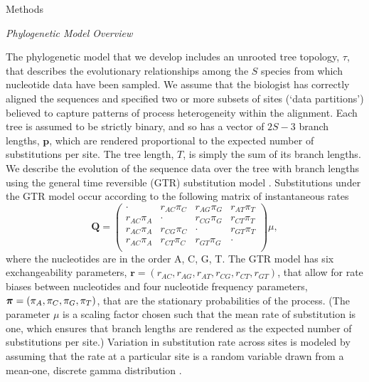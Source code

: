 \documentclass[11pt]{article}
\begin{document}
\bigskip

\begin{center}
{\sc Methods}
\end{center}

\begin{center}
{\it Phylogenetic Model Overview}
\end{center}

The phylogenetic model that we develop includes an unrooted tree topology, $\tau$, that describes the evolutionary relationships among the ${S}$ species from which nucleotide data have been sampled.
We assume that the biologist has correctly aligned the sequences and specified two or more subsets of sites (`data partitions') believed to capture patterns of process heterogeneity within the alignment.   
Each tree is assumed to be strictly binary, and so has a vector of $2S-3$ branch lengths, ${\mathbf p}$, which are rendered proportional to the expected number of substitutions per site.
The tree length, $T$, is simply the sum of its branch lengths. 
We describe the evolution of the sequence data over the tree with branch lengths using the general time reversible (GTR) substitution model \citep{tavare86}.
Substitutions under the GTR model occur according to the following matrix of instantaneous rates
$$
{\mathbf Q} = \left( \begin{array}{cccc}
\cdot       & r_{AC}\pi_C & r_{AG}\pi_G & r_{AT}\pi_T \\
r_{AC}\pi_A & \cdot       & r_{CG}\pi_G & r_{CT}\pi_T \\
r_{AC}\pi_A & r_{CG}\pi_C & \cdot       & r_{GT}\pi_T \\
r_{AC}\pi_A & r_{CT}\pi_C & r_{GT}\pi_G & \cdot       \\
\end{array} \right) \mu,
$$
where the nucleotides are in the order A, C, G, T. The GTR model has six exchangeability parameters, ${\mathbf r} = (r_{AC}, r_{AG}, r_{AT}, r_{CG}, r_{CT}, r_{GT})$, that allow for rate biases between nucleotides and four nucleotide frequency parameters, $\mbox{\boldmath$\pi$\unboldmath} = (\pi_A, \pi_C, \pi_G, \pi_T)$, that are the stationary probabilities of the process. 
(The parameter $\mu$ is a scaling factor chosen such that the mean rate of substitution is one, which ensures that branch lengths are rendered as the expected number of substitutions per site.)
Variation in substitution rate across sites is modeled by assuming that the rate at a particular site is a random variable drawn from a mean-one, discrete gamma distribution \citep{yang93,yang94a}.
\end{document}
